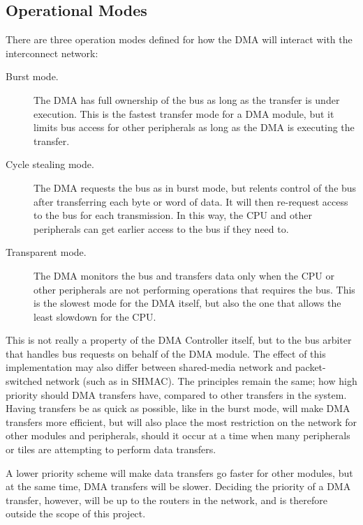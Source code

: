 \subsection{Operational Modes}
There are three operation modes defined for how the DMA will interact with the interconnect network:
\begin{description}
    \item[Burst mode.] 
    The DMA has full ownership of the bus as long as the transfer is under execution.
    This is the fastest transfer mode for a DMA module, but it limits bus access for other
    peripherals as long as the DMA is executing the transfer. \cite{encyclopedia}

    \item[Cycle stealing mode.] 
    The DMA requests the bus as in burst mode, but relents control of the bus after transferring
    each byte or word of data. It will then re-request access to the bus for each transmission.
    In this way, the CPU and other peripherals can get earlier access to the bus if they need to. \cite{encyclopedia}

    \item[Transparent mode.] 
    The DMA monitors the bus and transfers data only when the CPU or other peripherals are not performing operations that requires the bus.
    This is the slowest mode for the DMA itself, but also the one that allows the least slowdown for the CPU. \cite{dma-lecture}
\end{description}

This is not really a property of the DMA Controller itself, but to the bus arbiter that handles bus requests on behalf of the DMA module.
The effect of this implementation may also differ between shared-media network and packet-switched network (such as in SHMAC).
The principles remain the same; how high priority should DMA transfers have, compared to other transfers in the system. 
Having transfers be as quick as possible, like in the burst mode, will make DMA transfers more efficient, but will also place the most restriction on the network for other modules and peripherals, should it occur at a time when many peripherals or tiles are attempting to perform data transfers.

A lower priority scheme will make data transfers go faster for other modules, but at
the same time, DMA transfers will be slower. Deciding the priority of a DMA transfer,
however, will be up to the routers in the network, and is therefore outside the scope of this project.

